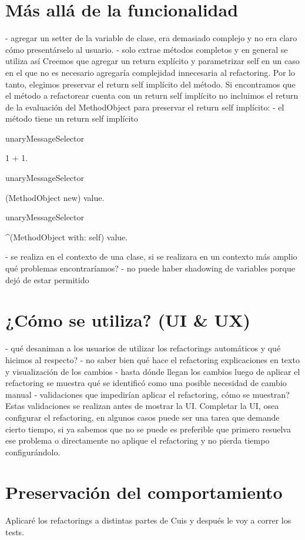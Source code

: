 \section{Más allá de la funcionalidad}
- agregar un setter de la variable de clase, era demasiado complejo y no era claro cómo presentárselo al usuario.
- solo extrae métodos completos y en general se utiliza así
Creemos que agregar un return explícito y parametrizar self en un caso en el que no es necesario
agregaría complejidad innecesaria al refactoring. Por lo tanto, elegimos preservar el return self
implícito del método. Si encontramos que el método a refactorear cuenta con un return self implícito
no incluimos el return de la evaluación del MethodObject para preservar el return self implícito:
- el método tiene un return self implícito

\begin{code}

unaryMessageSelector

 1 + 1.

unaryMessageSelector
 
 (MethodObject new) value.

unaryMessageSelector

 ^(MethodObject with: self) value.

\end{code}

- se realiza en el contexto de una clase, si se realizara en un contexto más amplio qué problemas encontraríamos?
- no puede haber shadowing de variables porque dejó de estar permitido

\section{¿Cómo se utiliza? (UI \& UX)}
- qué desaniman a los usuarios de utilizar los refactorings automáticos y qué hicimos al respecto?
    - no saber bien qué hace el refactoring
    explicaciones en texto y visualización de los cambios
    - hasta dónde llegan los cambios
    luego de aplicar el refactoring se muestra qué se identificó como una posible necesidad de cambio manual
- validaciones que impedirían aplicar el refactoring, cómo se muestran? Estas validaciones se
realizan antes de mostrar la UI. Completar la UI, osea configurar el refactoring, en algunos
casos puede ser una tarea que demande cierto tiempo, si ya sabemos que no se puede es preferible
que primero resuelva ese problema o directamente no aplique el refactoring y no pierda tiempo
configurándolo.


\section{Preservación del comportamiento}
Aplicaré los refactorings a distintas partes de Cuis y después le voy a correr los tests.